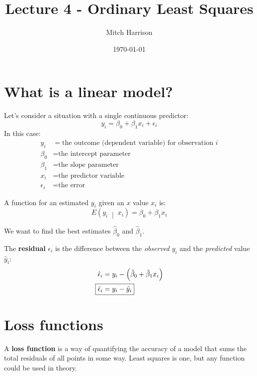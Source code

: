 \documentclass[titlepage, 12pt, leqno]{article}
\title{\Huge{Lecture 4 - Ordinary Least Squares}}
\author{\large{Mitch Harrison}}
\date{\today}
\begin{document}
\setlength{\parskip}{1\baselineskip}
\setlength{\parindent}{15pt}
\maketitle
\tableofcontents
\newpage


\section{What is a linear model?}
Let's consider a situation with a single continuous predictor:
\[
    y_i = \beta_0 + \beta_1x_i + \epsilon_i 
\]
In this case:
\begin{align*}
    y_i &= \text{the outcome (dependent variable) for observation } i \\
    \beta_0 &= \text{the intercept parameter} \\
    \beta_1 &= \text{the slope parameter} \\
    x_i &= \text{the predictor variable} \\
    \epsilon_i &= \text{the error}
\end{align*}

A function for an estimated $y_i$ given an $x$ value $x_i$ is:
\[
    E\left(y_i \;\middle|\; x_i\right) = \beta_0 + \beta_1x_i
\]

We want to find the best estimates $\hat{\beta}_0$ and $\hat{\beta}_1$.

\begin{definition}
    The \textbf{residual} $\epsilon_i$ is the difference between the \textit{observed} $y_i$ and the \textit{predicted} value $\hat{y}_i$:
   \begin{align*}
       \hat{\epsilon}_i &= y_i - \left(\hat{\beta}_0 + \hat{\beta}_1x_i\right) \\
       \Aboxed{\hat{\epsilon}_i &= y_i - \hat{y}_i}
   \end{align*}
\end{definition}
\pagebreak

\section{Loss functions}
\begin{definition}
    A \textbf{loss function} is a way of quantifying the accuracy of a model that sums the total residuals of all points in some way. Least squares is one, but any function could be used in theory.
\end{definition}
\end{document}
